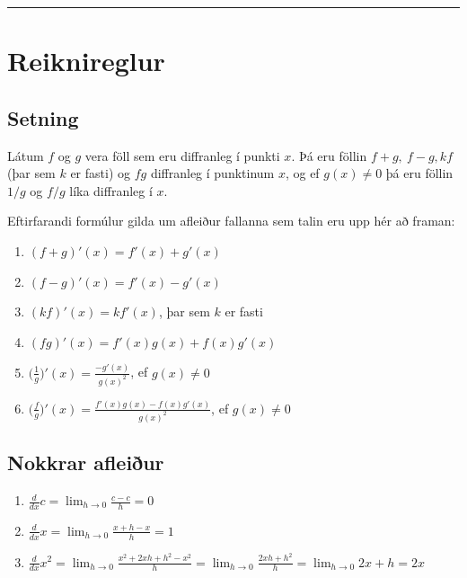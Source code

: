 \documentclass[a4paper,10pt,icelandic]{sphinxmanual}
\begin{document}
\bigskip\hrule{}\bigskip



\section{Reiknireglur}
\label{kafli03:reiknireglur}

\subsection{Setning}
\label{kafli03:id4}\label{kafli03:setning-3-3-1}
Látum \(f\) og \(g\) vera föll sem eru diffranleg í punkti
\(x\). Þá eru föllin \(f+g,\ f-g, kf\) (þar sem \(k\) er
fasti) og \(fg\) diffranleg í punktinum \(x\), og ef
\(g(x)\neq 0\) þá eru föllin \(1/g\) og \(f/g\) líka
diffranleg í \(x\).

Eftirfarandi formúlur gilda um afleiður fallanna sem talin eru upp hér
að framan:
\begin{enumerate}
\item {} 
\((f+g)'(x)=f'(x)+g'(x)\)

\item {} 
\((f-g)'(x)=f'(x)-g'(x)\)

\item {} 
\((kf)'(x)=kf'(x)\), þar sem \(k\) er fasti

\item {} 
\((fg)'(x)=f'(x)g(x)+f(x)g'(x)\)

\item {} 
\(\displaystyle\Bigg(\frac{1}{g}\Bigg)'(x)=\frac{-g'(x)}{g(x)^2}\),
ef \(g(x)\neq 0\)

\item {} 
\(\displaystyle\Bigg(\frac{f}{g}\Bigg)'(x)=
\frac{f'(x)g(x)-f(x)g'(x)}{g(x)^2}\), ef \(g(x)\neq 0\)

\end{enumerate}


\subsection{Nokkrar afleiður}
\label{kafli03:nokkrar-afleiur}\label{kafli03:setning-3-3-2}\begin{enumerate}
\item {} 
\(\frac{d}{dx} c =  \lim_{h\to 0} \frac{c-c}h = 0\)

\item {} 
\(\frac{d}{dx} x =  \lim_{h\to 0} \frac{x+h-x}h = 1\)

\item {} 
\(\frac{d}{dx} x^2 = \lim_{h\to 0} \frac{x^2+2xh+h^2-x^2}h
= \lim_{h\to 0} \frac{2xh + h^2}h = \lim_{h\to 0} 2x+h= 2x\)

\end{enumerate}
\end{document}
